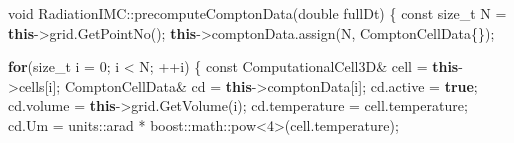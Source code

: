 \documentclass[
]{article}
\newenvironment{Shaded}{}{}
\newcommand{\AttributeTok}[1]{\textcolor[rgb]{0.49,0.56,0.16}{#1}}
\newcommand{\ControlFlowTok}[1]{\textcolor[rgb]{0.00,0.44,0.13}{\textbf{#1}}}
\newcommand{\DataTypeTok}[1]{\textcolor[rgb]{0.56,0.13,0.00}{#1}}
\newcommand{\DecValTok}[1]{\textcolor[rgb]{0.25,0.63,0.44}{#1}}
\newcommand{\ExtensionTok}[1]{#1}
\newcommand{\KeywordTok}[1]{\textcolor[rgb]{0.00,0.44,0.13}{\textbf{#1}}}
\newcommand{\NormalTok}[1]{#1}
\newcommand{\OperatorTok}[1]{\textcolor[rgb]{0.40,0.40,0.40}{#1}}
\begin{document}
\begin{Shaded}
\begin{Highlighting}[]
\DataTypeTok{void}\NormalTok{ RadiationIMC}\OperatorTok{::}\NormalTok{precomputeComptonData}\OperatorTok{(}\DataTypeTok{double}\NormalTok{ fullDt}\OperatorTok{)}
\OperatorTok{\{}
    \AttributeTok{const} \DataTypeTok{size\_t}\NormalTok{ N }\OperatorTok{=} \KeywordTok{this}\OperatorTok{{-}\textgreater{}}\NormalTok{grid}\OperatorTok{.}\NormalTok{GetPointNo}\OperatorTok{();}
    \KeywordTok{this}\OperatorTok{{-}\textgreater{}}\NormalTok{comptonData}\OperatorTok{.}\NormalTok{assign}\OperatorTok{(}\NormalTok{N}\OperatorTok{,}\NormalTok{ ComptonCellData}\OperatorTok{\{\});}

    \ControlFlowTok{for}\OperatorTok{(}\DataTypeTok{size\_t}\NormalTok{ i }\OperatorTok{=} \DecValTok{0}\OperatorTok{;}\NormalTok{ i }\OperatorTok{\textless{}}\NormalTok{ N}\OperatorTok{;} \OperatorTok{++}\NormalTok{i}\OperatorTok{)}
    \OperatorTok{\{}
        \AttributeTok{const}\NormalTok{ ComputationalCell3D}\OperatorTok{\&}\NormalTok{ cell }\OperatorTok{=} \KeywordTok{this}\OperatorTok{{-}\textgreater{}}\NormalTok{cells}\OperatorTok{[}\NormalTok{i}\OperatorTok{];}
\NormalTok{        ComptonCellData}\OperatorTok{\&}\NormalTok{ cd }\OperatorTok{=} \KeywordTok{this}\OperatorTok{{-}\textgreater{}}\NormalTok{comptonData}\OperatorTok{[}\NormalTok{i}\OperatorTok{];}
\NormalTok{        cd}\OperatorTok{.}\NormalTok{active }\OperatorTok{=} \KeywordTok{true}\OperatorTok{;}
\NormalTok{        cd}\OperatorTok{.}\NormalTok{volume }\OperatorTok{=} \KeywordTok{this}\OperatorTok{{-}\textgreater{}}\NormalTok{grid}\OperatorTok{.}\NormalTok{GetVolume}\OperatorTok{(}\NormalTok{i}\OperatorTok{);}
\NormalTok{        cd}\OperatorTok{.}\NormalTok{temperature }\OperatorTok{=}\NormalTok{ cell}\OperatorTok{.}\NormalTok{temperature}\OperatorTok{;}
\NormalTok{        cd}\OperatorTok{.}\NormalTok{Um }\OperatorTok{=}\NormalTok{ units}\OperatorTok{::}\NormalTok{arad }\OperatorTok{*} \ExtensionTok{boost::}\NormalTok{math::pow}\OperatorTok{\textless{}}\DecValTok{4}\OperatorTok{\textgreater{}(}\NormalTok{cell}\OperatorTok{.}\NormalTok{temperature}\OperatorTok{);}


\end{Highlighting}
\end{Shaded}
\end{document}
